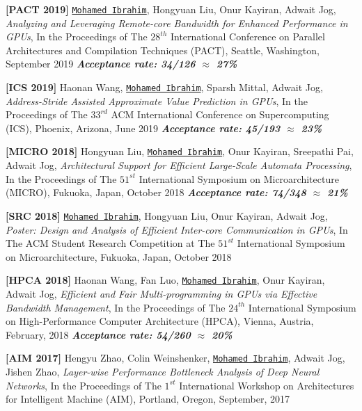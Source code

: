 \documentclass[10pt,a4]{article}
\begin{document}
\begin{description}
\item 
{\bf [PACT 2019]}
{\tt \underline{Mohamed Ibrahim}}, Hongyuan Liu, Onur Kayiran, Adwait Jog,
{\it Analyzing and Leveraging Remote-core Bandwidth for Enhanced Performance in GPUs},
In the Proceedings of The $28^{th}$ International Conference on Parallel Architectures and Compilation Techniques (PACT), 
Seattle, Washington, September 2019
\textbf{\textit{Acceptance rate: 34/126 $\approx$ 27\%}}

\item 
{\bf [ICS 2019]}
Haonan Wang, {\tt \underline{Mohamed Ibrahim}}, Sparsh Mittal, Adwait Jog, 
{\it Address-Stride Assisted Approximate Value Prediction in GPUs},
In the Proceedings of The $33^{rd}$ ACM International Conference on Supercomputing (ICS), 
Phoenix, Arizona, June 2019
\textbf{\textit{Acceptance rate: 45/193 $\approx$ 23\%}}

\item 
{\bf [MICRO 2018]}
Hongyuan Liu, {\tt \underline{Mohamed Ibrahim}}, Onur Kayiran, Sreepathi Pai, Adwait Jog, 
{\it Architectural Support for Efficient Large-Scale Automata Processing},
In the Proceedings of The $51^{st}$ International Symposium on Microarchitecture (MICRO), 
Fukuoka, Japan, October 2018
\textbf{\textit{Acceptance rate: 74/348 $\approx$ 21\%}}

\item 
{\bf [SRC 2018]}
{\tt \underline{Mohamed Ibrahim}}, Hongyuan Liu, Onur Kayiran, Adwait Jog, 
{\it Poster: Design and Analysis of Efficient Inter-core Communication in GPUs},
In The ACM Student Research Competition at The $51^{st}$ International Symposium on Microarchitecture,
Fukuoka, Japan, October 2018

\item 
{\bf [HPCA 2018]}
Haonan Wang, Fan Luo, {\tt \underline{Mohamed Ibrahim}}, Onur Kayiran, Adwait Jog, 
{\it Efficient and Fair Multi-programming in GPUs via Effective Bandwidth Management},
In the Proceedings of The $24^{th}$ International Symposium on High-Performance Computer Architecture (HPCA), 
Vienna, Austria, February, 2018
\textbf{\textit{Acceptance rate: 54/260 $\approx$ 20\%}}

\item 
{\bf [AIM 2017]}
Hengyu Zhao, Colin Weinshenker, {\tt \underline{Mohamed Ibrahim}}, Adwait Jog, Jishen Zhao,
{\it Layer-wise Performance Bottleneck Analysis of Deep Neural Networks},
In the Proceedings of The $1^{st}$ International Workshop on Architectures for Intelligent Machine (AIM), 
Portland, Oregon, September, 2017


\end{description}
\end{document}
